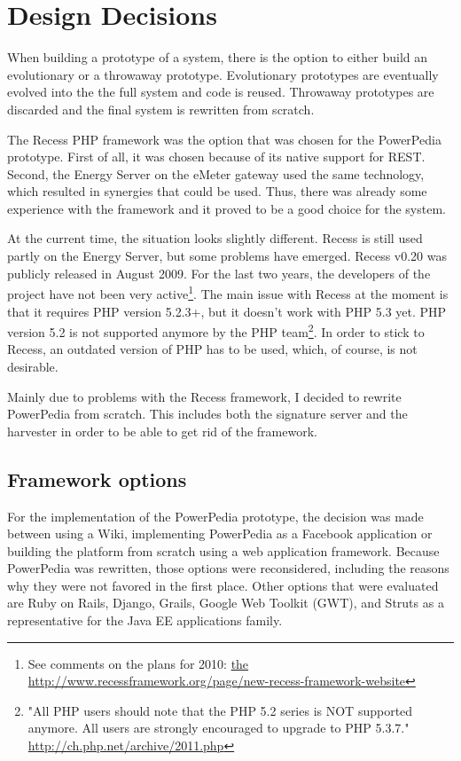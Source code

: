 \section{Design Decisions}
When building a prototype of a system, there is the option to either build an evolutionary or a throwaway prototype. Evolutionary prototypes are eventually evolved into the the full system\cite{interactive_systems} and code is reused. Throwaway prototypes are discarded and the final system is rewritten from scratch. 

The Recess PHP framework was the option that was chosen for the PowerPedia prototype. First of all, it was chosen because of its native support for REST. Second, the Energy Server on the eMeter gateway used the same technology, which resulted in synergies that could be used. Thus, there was already some experience with the framework and it proved to be a good choice for the system.

At the current time, the situation looks slightly different. Recess is still used partly on the Energy Server, but some problems have emerged. Recess v0.20 was publicly released in August 2009. For the last two years, the developers of the project have not been very active\footnote{See comments on the plans for 2010: \url{the http://www.recessframework.org/page/new-recess-framework-website}}. The main issue with Recess at the moment is that it requires PHP version 5.2.3+, but it doesn't work with PHP 5.3 yet. PHP version 5.2 is not supported anymore by the PHP team\footnote{"All PHP users should note that the PHP 5.2 series is NOT supported anymore. All users are strongly encouraged to upgrade to PHP 5.3.7." \url{http://ch.php.net/archive/2011.php}}. In order to stick to Recess, an outdated version of PHP has to be used, which, of course, is not desirable.  

Mainly due to problems with the Recess framework, I decided to rewrite PowerPedia from scratch. This includes both the signature server and the harvester in order to be able to get rid of the framework. 

\subsection{Framework options}
For the implementation of the PowerPedia prototype, the decision was made between using a Wiki, implementing PowerPedia as a Facebook application or building the platform from scratch using a web application framework. 
Because PowerPedia was rewritten, those options were reconsidered, including the reasons why they were not favored in the first place. Other options that were evaluated are Ruby on Rails, Django, Grails, Google Web Toolkit (GWT), and Struts as a representative for the Java EE applications family.    

